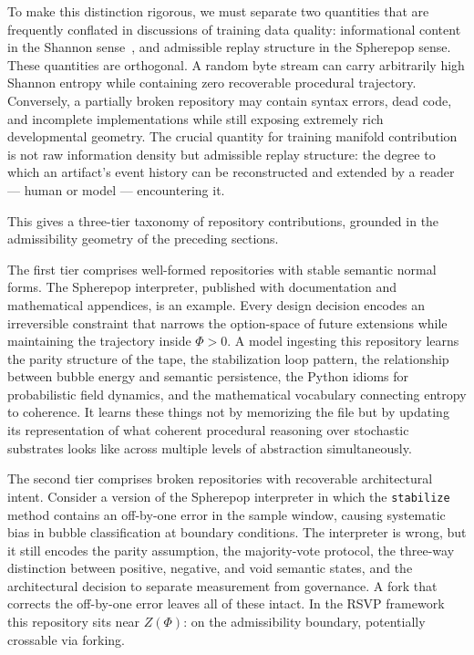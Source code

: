 \documentclass[11pt]{article}
\begin{document}
To make this distinction rigorous, we must separate two quantities that are
frequently conflated in discussions of training data quality: informational
content in the Shannon sense~\cite{shannon1948}, and admissible replay structure
in the Spherepop sense. These quantities are orthogonal. A random byte stream
can carry arbitrarily high Shannon entropy while containing zero recoverable
procedural trajectory. Conversely, a partially broken repository may contain
syntax errors, dead code, and incomplete implementations while still exposing
extremely rich developmental geometry. The crucial quantity for training manifold
contribution is not raw information density but admissible replay structure: the
degree to which an artifact's event history can be reconstructed and extended by
a reader --- human or model --- encountering it.

This gives a three-tier taxonomy of repository contributions, grounded in the
admissibility geometry of the preceding sections.

The first tier comprises well-formed repositories with stable semantic normal
forms. The Spherepop interpreter, published with documentation and mathematical
appendices, is an example. Every design decision encodes an irreversible
constraint that narrows the option-space of future extensions while maintaining
the trajectory inside $\Phi > 0$. A model ingesting this repository learns the
parity structure of the tape, the stabilization loop pattern, the relationship
between bubble energy and semantic persistence, the Python idioms for
probabilistic field dynamics, and the mathematical vocabulary connecting entropy
to coherence. It learns these things not by memorizing the file but by updating
its representation of what coherent procedural reasoning over stochastic
substrates looks like across multiple levels of abstraction simultaneously.

The second tier comprises broken repositories with recoverable architectural
intent. Consider a version of the Spherepop interpreter in which the
\texttt{stabilize} method contains an off-by-one error in the sample window,
causing systematic bias in bubble classification at boundary conditions. The
interpreter is wrong, but it still encodes the parity assumption, the
majority-vote protocol, the three-way distinction between positive, negative,
and void semantic states, and the architectural decision to separate measurement
from governance. A fork that corrects the off-by-one error leaves all of these
intact. In the RSVP framework this repository sits near $Z(\Phi)$: on the
admissibility boundary, potentially crossable via forking.
\end{document}
